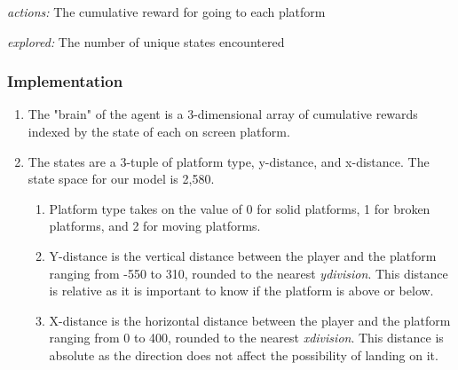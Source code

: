 \documentclass[a4paper, 12pt]{article}
\begin{document}
\textit{actions:} The cumulative reward for going to each platform


\textit{explored:} The number of unique states encountered



\subsubsection{Implementation}
	\begin{enumerate}
    	\item The "brain" of the agent is a 3-dimensional array of cumulative rewards indexed by the state of each on screen platform.
        \item The states are a 3-tuple of platform type, y-distance, and x-distance. The state space for our model is 2,580.
        	\begin{enumerate}
            	\item Platform type takes on the value of 0 for solid platforms, 1 for broken platforms, and 2 for moving platforms.
                \item Y-distance is the vertical distance between the player and the platform ranging from -550 to 310, rounded to the nearest \textit{ydivision}. This distance is relative as it is important to know if the platform is above or below.
                \item X-distance is the horizontal distance between the player and the platform ranging from 0 to 400, rounded to the nearest \textit{xdivision}. This distance is absolute as the direction does not affect the possibility of landing on it.
            \end{enumerate}
    \end{enumerate}
\end{document}
